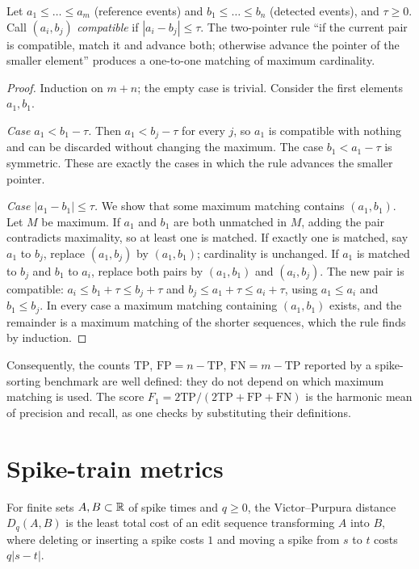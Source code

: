 \begin{theorem}\label{ars:count-007}
Let $a_1\le\dots\le a_m$ (reference events) and $b_1\le\dots\le b_n$ (detected events), and $\tau\ge0$. Call $(a_i,b_j)$ \emph{compatible} if $|a_i-b_j|\le\tau$. The two-pointer rule ``if the current pair is compatible, match it and advance both; otherwise advance the pointer of the smaller element'' produces a one-to-one matching of maximum cardinality.
\end{theorem}
\begin{proof}
Induction on $m+n$; the empty case is trivial. Consider the first elements $a_1,b_1$.

\emph{Case $a_1<b_1-\tau$.} Then $a_1<b_j-\tau$ for every $j$, so $a_1$ is compatible with nothing and can be discarded without changing the maximum. The case $b_1<a_1-\tau$ is symmetric. These are exactly the cases in which the rule advances the smaller pointer.

\emph{Case $|a_1-b_1|\le\tau$.} We show that some maximum matching contains $(a_1,b_1)$. Let $M$ be maximum. If $a_1$ and $b_1$ are both unmatched in $M$, adding the pair contradicts maximality, so at least one is matched. If exactly one is matched, say $a_1$ to $b_j$, replace $(a_1,b_j)$ by $(a_1,b_1)$; cardinality is unchanged. If $a_1$ is matched to $b_j$ and $b_1$ to $a_i$, replace both pairs by $(a_1,b_1)$ and $(a_i,b_j)$. The new pair is compatible: $a_i\le b_1+\tau\le b_j+\tau$ and $b_j\le a_1+\tau\le a_i+\tau$, using $a_1\le a_i$ and $b_1\le b_j$. In every case a maximum matching containing $(a_1,b_1)$ exists, and the remainder is a maximum matching of the shorter sequences, which the rule finds by induction.
\end{proof}
Consequently, the counts $\mathrm{TP}$, $\mathrm{FP}=n-\mathrm{TP}$, $\mathrm{FN}=m-\mathrm{TP}$ reported by a spike-sorting benchmark are well defined: they do not depend on which maximum matching is used. The score $F_1=2\mathrm{TP}/(2\mathrm{TP}+\mathrm{FP}+\mathrm{FN})$ is the harmonic mean of precision and recall, as one checks by substituting their definitions.

\section{Spike-train metrics}
For finite sets $A,B\subset\mathbb R$ of spike times and $q\ge0$, the Victor--Purpura distance $D_q(A,B)$ is the least total cost of an edit sequence transforming $A$ into $B$, where deleting or inserting a spike costs $1$ and moving a spike from $s$ to $t$ costs $q|s-t|$.

